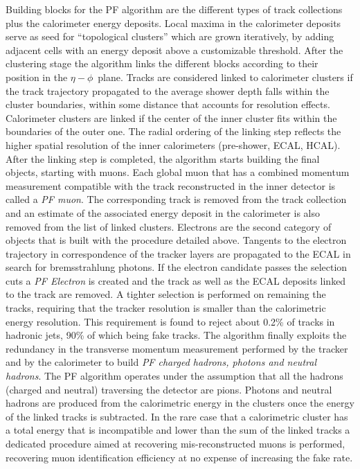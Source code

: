 Building blocks for the PF algorithm are the different types of track collections plus the calorimeter energy deposits. Local maxima in the calorimeter deposits serve as seed for ``topological clusters'' which are grown iteratively, by adding adjacent cells with an energy deposit above a customizable threshold. After the clustering stage the algorithm links the different blocks according to their position in the $\eta-\phi$\ plane. Tracks are considered linked to calorimeter clusters if the track trajectory propagated to the average shower depth falls within the cluster boundaries, within some distance that accounts for resolution effects. Calorimeter clusters are linked if the center of the inner cluster fits within the boundaries of the outer one. The radial ordering of the linking step reflects the higher spatial resolution of the inner calorimeters (pre-shower, ECAL, HCAL). After the linking step is completed, the algorithm starts building the final objects, starting with muons. Each global muon that has a combined momentum measurement compatible with the track reconstructed in the inner detector is called a \emph{PF muon}. The corresponding track is removed from the track collection and an estimate of the associated energy deposit in the calorimeter is also removed from the list of linked clusters. Electrons are the second category of objects that is built with the procedure detailed above. Tangents to the electron trajectory in correspondence of the tracker layers are propagated to the ECAL in search for bremsstrahlung photons. If the electron candidate passes the selection cuts a \emph{PF Electron} is created and the track as well as the ECAL deposits linked to the track are removed. A tighter selection is performed on remaining the tracks, requiring that the tracker \pT resolution is smaller than the calorimetric energy resolution. This requirement is found to reject about 0.2\% of tracks in hadronic jets, 90\% of which being fake tracks. 
The algorithm finally exploits the redundancy in the transverse momentum measurement performed by the tracker and by the calorimeter to build \emph{PF charged hadrons, photons and neutral hadrons}. The PF algorithm operates under the assumption that all the hadrons (charged and neutral) traversing the detector are pions. Photons and neutral hadrons are produced from the calorimetric energy in the clusters once the energy of the linked tracks is subtracted. In the rare case that a calorimetric cluster has a total energy that is incompatible and lower than the sum of the linked tracks a dedicated procedure aimed at recovering mis-reconstructed muons is performed, recovering muon identification efficiency at no expense of increasing the fake rate.%


